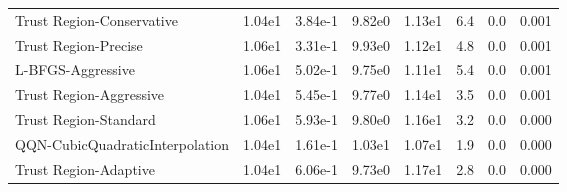 \documentclass{article}
\begin{document}
\begin{table}[htbp]
{\begin{tabular}{p{2.5cm}*{7}{c}}
Trust Region-Conservative & 1.04e1 & 3.84e-1 & 9.82e0 & 1.13e1 & 6.4 & 0.0 & 0.001 \\
Trust Region-Precise & 1.06e1 & 3.31e-1 & 9.93e0 & 1.12e1 & 4.8 & 0.0 & 0.001 \\
L-BFGS-Aggressive & 1.06e1 & 5.02e-1 & 9.75e0 & 1.11e1 & 5.4 & 0.0 & 0.001 \\
Trust Region-Aggressive & 1.04e1 & 5.45e-1 & 9.77e0 & 1.14e1 & 3.5 & 0.0 & 0.001 \\
Trust Region-Standard & 1.06e1 & 5.93e-1 & 9.80e0 & 1.16e1 & 3.2 & 0.0 & 0.000 \\
QQN-CubicQuadraticInterpolation & 1.04e1 & 1.61e-1 & 1.03e1 & 1.07e1 & 1.9 & 0.0 & 0.000 \\
Trust Region-Adaptive & 1.04e1 & 6.06e-1 & 9.73e0 & 1.17e1 & 2.8 & 0.0 & 0.000 \\
\bottomrule
\end{tabular}
}
\end{table}
\end{document}
